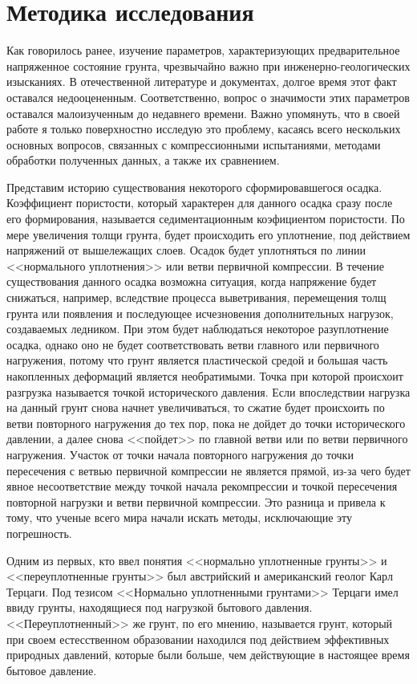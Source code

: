 \chapter{Методика исследования}

Как говорилось ранее, изучение параметров, характеризующих предварительное напряженное состояние грунта, чрезвычайно важно при инженерно-геологических изысканиях. В отечественной литературе и документах, долгое время этот факт оставался недооцененным. Соответственно, вопрос о значимости этих параметров оставался малоизученным до недавнего времени. Важно упомянуть, что в своей работе я только поверхностно исследую это проблему,  касаясь всего нескольких основных вопросов, связанных с компрессионными испытаниями, методами обработки полученных данных, а также их сравнением.

Представим историю существования некоторого сформировавшегося осадка. Коэффициент пористости, который характерен для данного осадка сразу после его формирования, называется седиментационным коэфициентом пористости. По мере увеличения толщи грунта, будет происходить его уплотнение, под действием напряжений от вышележащих слоев. Осадок будет уплотняться по линии <<нормального уплотнения>> или ветви первичной компрессии. В течение существования данного осадка возможна ситуация, когда напряжение будет снижаться, например, вследствие процесса выветривания, перемещения толщ грунта или появления и последующее исчезновения дополнительных нагрузок, создаваемых ледником. При этом будет наблюдаться некоторое разуплотнение осадка, однако оно не будет соответствовать ветви главного или первичного нагружения, потому что грунт является пластической средой  и большая часть накопленных деформаций является необратимыми. Точка при которой происхоит разгрузка называется точкой исторического давления. Если впоследствии нагрузка на данный грунт снова начнет увеличиваться, то сжатие будет происхоить по ветви повторного нагружения до тех пор, пока не дойдет до точки исторического давлении, а далее снова <<пойдет>> по главной ветви или по ветви первичного нагружения. Участок от точки начала повторного нагружения до точки пересечения с ветвью первичной компрессии не является прямой, из-за чего будет явное несоответствие между точкой начала рекомпрессии и точкой пересечения повторной нагрузки и ветви первичной компрессии. Это разница и привела к тому, что ученые всего мира начали искать методы, исключающие эту погрешность.

Одним из первых, кто ввел понятия <<нормально уплотненные грунты>> и <<переуплотненные грунты>> был австрийский и американский геолог Карл Терцаги. Под тезисом <<Нормально уплотненными грунтами>> Терцаги имел ввиду грунты, находящиеся под нагрузкой бытового давления. <<Переуплотненный>> же грунт, по его мнению, называется грунт, который при своем естесственном образовании находился под действием эффективных природных давлений, которые были больше, чем действующие в настоящее время бытовое давление. 


